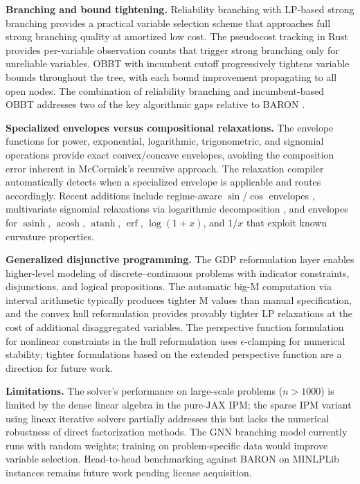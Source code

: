 \documentclass[12pt,preprint]{article}
\begin{document}
\textbf{Branching and bound tightening.} Reliability branching \cite{Achterberg2005} with LP-based strong branching provides a practical variable selection scheme that approaches full strong branching quality at amortized low cost. The pseudocost tracking in Rust provides per-variable observation counts that trigger strong branching only for unreliable variables. OBBT with incumbent cutoff \cite{Gleixner2017} progressively tightens variable bounds throughout the tree, with each bound improvement propagating to all open nodes. The combination of reliability branching and incumbent-based OBBT addresses two of the key algorithmic gaps relative to BARON \cite{Tawarmalani2005}.

\textbf{Specialized envelopes versus compositional relaxations.} The envelope functions for power, exponential, logarithmic, trigonometric, and signomial operations provide exact convex/concave envelopes, avoiding the composition error inherent in McCormick's recursive approach. The relaxation compiler automatically detects when a specialized envelope is applicable and routes accordingly. Recent additions include regime-aware $\sin$/$\cos$ envelopes \cite{Locatelli2014}, multivariate signomial relaxations via logarithmic decomposition \cite{Maranas1997}, and envelopes for $\operatorname{asinh}$, $\operatorname{acosh}$, $\operatorname{atanh}$, $\operatorname{erf}$, $\log(1+x)$, and $1/x$ that exploit known curvature properties.

\textbf{Generalized disjunctive programming.} The GDP reformulation layer \cite{Raman1994,Grossmann2002} enables higher-level modeling of discrete--continuous problems with indicator constraints, disjunctions, and logical propositions. The automatic big-M computation via interval arithmetic typically produces tighter M values than manual specification, and the convex hull reformulation \cite{Lee2001} provides provably tighter LP relaxations at the cost of additional disaggregated variables. The perspective function formulation for nonlinear constraints in the hull reformulation uses $\epsilon$-clamping for numerical stability; tighter formulations based on the extended perspective function \cite{Trespalacios2015} are a direction for future work.

\textbf{Limitations.} The solver's performance on large-scale problems ($n > 1000$) is limited by the dense linear algebra in the pure-JAX IPM; the sparse IPM variant using lineax iterative solvers partially addresses this but lacks the numerical robustness of direct factorization methods. The GNN branching model currently runs with random weights; training on problem-specific data would improve variable selection. Head-to-head benchmarking against BARON on MINLPLib instances remains future work pending license acquisition.
\end{document}
